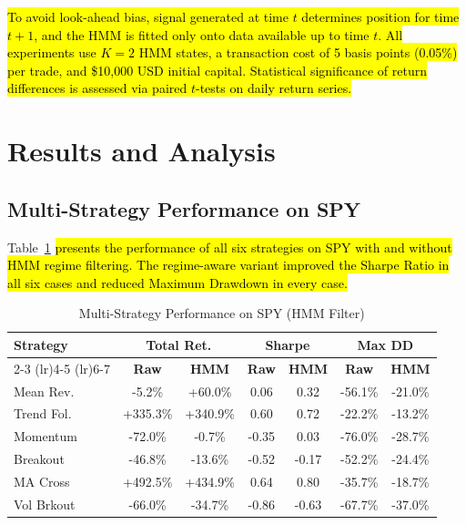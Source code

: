 \documentclass[conference]{IEEEtran}
\begin{document}
\hl{To avoid look-ahead bias, signal generated at time $t$ determines position for time $t+1$, and the HMM is fitted only onto data available up to time $t$. All experiments use $K = 2$ HMM states, a transaction cost of 5 basis points (0.05\%) per trade, and \$10,000 USD initial capital. Statistical significance of return differences is assessed via paired $t$-tests on daily return series.}

\section{Results and Analysis}

\subsection{Multi-Strategy Performance on SPY}

Table~\ref{tab:spy_results} \hl{presents the performance of all six strategies on SPY with and without HMM regime filtering. The regime-aware variant improved the Sharpe Ratio in all six cases and reduced Maximum Drawdown in every case.}

\begin{table}[htbp]
\caption{Multi-Strategy Performance on SPY (HMM Filter)}
\begin{center}
\footnotesize
\begin{tabular}{lcccccc}
\toprule
\textbf{Strategy} & \multicolumn{2}{c}{\textbf{Total Ret.}} & \multicolumn{2}{c}{\textbf{Sharpe}} & \multicolumn{2}{c}{\textbf{Max DD}} \\
\cmidrule(lr){2-3} \cmidrule(lr){4-5} \cmidrule(lr){6-7}
 & \textbf{Raw} & \textbf{HMM} & \textbf{Raw} & \textbf{HMM} & \textbf{Raw} & \textbf{HMM} \\
\midrule
Mean Rev. & -5.2\% & +60.0\% & 0.06 & 0.32 & -56.1\% & -21.0\% \\
Trend Fol. & +335.3\% & +340.9\% & 0.60 & 0.72 & -22.2\% & -13.2\% \\
Momentum & -72.0\% & -0.7\% & -0.35 & 0.03 & -76.0\% & -28.7\% \\
Breakout & -46.8\% & -13.6\% & -0.52 & -0.17 & -52.2\% & -24.4\% \\
MA Cross & +492.5\% & +434.9\% & 0.64 & 0.80 & -35.7\% & -18.7\% \\
Vol Brkout & -66.0\% & -34.7\% & -0.86 & -0.63 & -67.7\% & -37.0\% \\
\bottomrule
\end{tabular}
\label{tab:spy_results}
\end{center}
\end{table}
\end{document}
